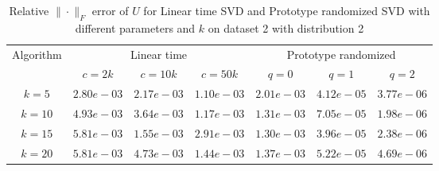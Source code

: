 \begin{table}\label{U22}
\centering
\begin{tabular}{|c|c|c|c|c|c|c|}

\hline
\multirow{2}{*}{ Algorithm} &\multicolumn{3}{c|}{Linear time} &\multicolumn{3}{c|}{Prototype randomized}\\\cline{2-7}
 &$c=2k$ &$c=10k$ &$c=50k$ &$q=0$ &$q=1$ &$q=2$\\\hline
$k=5$ & $2.80e-03$ & $2.17e-03$ & $1.10e-03$ & $2.01e-03$ & $4.12e-05$ & $3.77e-06$\\\hline
$k=10$ & $4.93e-03$ & $3.64e-03$ & $1.17e-03$ & $1.31e-03$ & $7.05e-05$ & $1.98e-06$\\\hline
$k=15$ & $5.81e-03$ & $1.55e-03$ & $2.91e-03$ & $1.30e-03$ & $3.96e-05$ & $2.38e-06$\\\hline
$k=20$ & $5.81e-03$ & $4.73e-03$ & $1.44e-03$ & $1.37e-03$ & $5.22e-05$ & $4.69e-06$\\\hline
\end{tabular}
\caption{Relative $\|\cdot\|_F$ error of $U$ for Linear time SVD and Prototype randomized SVD with different parameters and $k$ on dataset 2 with distribution 2}
\end{table}

